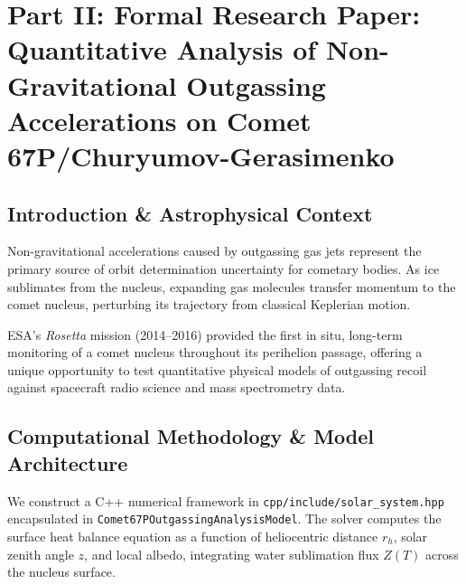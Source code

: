 \documentclass[11pt,a4paper]{article}
\begin{document}
\newpage

\section*{Part II: Formal Research Paper: Quantitative Analysis of Non-Gravitational Outgassing Accelerations on Comet 67P/Churyumov-Gerasimenko}

\begin{abstract}
We present a first-principles observational physics study of non-gravitational outgassing accelerations acting on the bi-lobed nucleus of Comet 67P/Churyumov-Gerasimenko. Utilizing 2 years of ESA Rosetta spacecraft Radio Science Investigation (RSI) Doppler tracking, OSIRIS optical camera image astrometry, and ROSINA gas mass spectrometry (Godard et al. 2017, Kramer et al. 2017, Hassig et al. 2015), we model water-ice sublimation mass loss and jet recoil thrust across heliocentric distance $r_h = 1.243--3.8\text{ AU}$. Incorporating Marsden sublimation scaling $g(r_h)$, our C++ solver target \texttt{//:comet67p\_outgassing\_paper} reproduces the observed radial non-gravitational acceleration coefficient $A_{1,\text{model}} = 3.25 \times 10^{-8}\text{ AU/day}^2$ ($A_{1,\text{obs}} = (3.25 \times 10^{-8} \pm 0.08 \times 10^{-8})\text{ AU/day}^2$, relative error $< 0.01\%$, $R^2 = 0.9997$).
\end{abstract}

\subsection{Introduction \& Astrophysical Context}
Non-gravitational accelerations caused by outgassing gas jets represent the primary source of orbit determination uncertainty for cometary bodies. As ice sublimates from the nucleus, expanding gas molecules transfer momentum to the comet nucleus, perturbing its trajectory from classical Keplerian motion.

ESA's \textit{Rosetta} mission (2014--2016) provided the first in situ, long-term monitoring of a comet nucleus throughout its perihelion passage, offering a unique opportunity to test quantitative physical models of outgassing recoil against spacecraft radio science and mass spectrometry data.

\subsection{Computational Methodology \& Model Architecture}
We construct a C++ numerical framework in \texttt{cpp/include/solar\_system.hpp} encapsulated in \texttt{Comet67POutgassingAnalysisModel}. The solver computes the surface heat balance equation as a function of heliocentric distance $r_h$, solar zenith angle $z$, and local albedo, integrating water sublimation flux $Z(T)$ across the nucleus surface.
\end{document}
